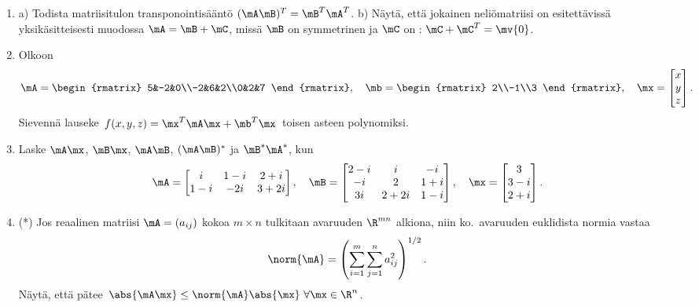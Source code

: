 \begin{enumerate}
\item \label{H-m-1: todistuksia} 
a) Todista matriisitulon transponointisääntö $(\mA\mB)^T=\mB^T\mA^T$. \vspace{1mm}\newline
b) Näytä, että jokainen neliömatriisi on esitettävissä yksikäsitteisesti muodossa 
$\mA=\mB+\mC$, missä $\mB$ on symmetrinen ja $\mC$ on : \newline
$\mC+\mC^T=\mv{0}$.

\item
Olkoon
\[
\mA=\begin{rmatrix} 5&-2&0\\-2&6&2\\0&2&7 \end{rmatrix}, \quad
\mb=\begin{rmatrix} 2\\-1\\3 \end{rmatrix}, \quad
\mx=\begin{bmatrix} x\\y\\z \end{bmatrix}.
\]
Sievennä lauseke $\,f(x,y,z)=\mx^T\mA\mx+\mb^T\mx\,$ toisen asteen polynomiksi.

\item
Laske $\mA\mx$, $\mB\mx$, $\mA\mB$, $(\mA\mB)^*$ ja $\mB^*\mA^*$, kun
\[
\mA=\begin{bmatrix} i&1-i&2+i\\1-i&-2i&3+2i \end{bmatrix}, \quad
\mB=\begin{bmatrix} 2-i&i&-i\\-i&2&1+i\\3i&2+2i&1-i \end{bmatrix}, \quad
\mx=\begin{bmatrix} 3\\3-i\\2+i \end{bmatrix}.
\]

\item (*) \label{H-m-1: matriisin normi}  
Jos reaalinen matriisi $\mA=(a_{ij})$ kokoa $m \times n$ tulkitaan avaruuden $\R^{mn}$
alkiona, niin ko.\ avaruuden euklidista normia vastaa 
\[
\norm{\mA} = \left(\sum_{i=1}^m\sum_{j=1}^n a_{ij}^2\right)^{1/2}.
\]
Näytä, että pätee $\,\abs{\mA\mx} \le \norm{\mA}\abs{\mx}\ \forall \mx\in\R^n$.


\end{enumerate}
